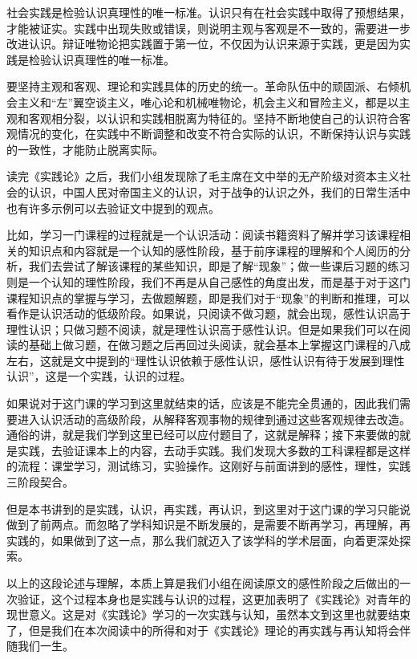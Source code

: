 \documentclass[a4paper, UTF8, twocolumn]{ctexart}
\begin{document}
社会实践是检验认识真理性的唯一标准。认识只有在社会实践中取得了预想结果，才能被证实。实践中出现失败或错误，则说明主观与客观是不一致的，需要进一步改进认识。辩证唯物论把实践置于第一位，不仅因为认识来源于实践，更是因为实践是检验认识真理性的唯一标准。

要坚持主观和客观、理论和实践具体的历史的统一。革命队伍中的顽固派、右倾机会主义和“左”翼空谈主义，唯心论和机械唯物论，机会主义和冒险主义，都是以主观和客观相分裂，以认识和实践相脱离为特征的。坚持不断地使自己的认识符合客观情况的变化，在实践中不断调整和改变不符合实际的认识，不断保持认识与实践的一致性，才能防止脱离实际。

读完《实践论》之后，我们小组发现除了毛主席在文中举的无产阶级对资本主义社会的认识，中国人民对帝国主义的认识，对于战争的认识之外，我们的日常生活中也有许多示例可以去验证文中提到的观点。

比如，学习一门课程的过程就是一个认识活动：阅读书籍资料了解并学习该课程相关的知识点和内容就是一个认知的感性阶段，基于前序课程的理解和个人阅历的分析，我们去尝试了解该课程的某些知识，即是了解“现象”；做一些课后习题的练习则是一个认知的理性阶段，我们不再是从自己感性的角度出发，而是基于对于这门课程知识点的掌握与学习，去做题解题，即是我们对于“现象”的判断和推理，可以看作是认识活动的低级阶段。如果说，只阅读不做习题，就会出现，感性认识高于理性认识；只做习题不阅读，就是理性认识高于感性认识。但是如果我们可以在阅读的基础上做习题，在做习题之后再回过头阅读，就会基本上掌握这门课程的八成左右，这就是文中提到的“理性认识依赖于感性认识，感性认识有待于发展到理性认识”，这是一个实践，认识的过程。

如果说对于这门课的学习到这里就结束的话，应该是不能完全贯通的，因此我们需要进入认识活动的高级阶段，从解释客观事物的规律到通过这些客观规律去改造。通俗的讲，就是我们学到这里已经可以应付题目了，这就是解释；接下来要做的就是实践，去验证课本上的内容，去动手实践。我们发现大多数的工科课程都是这样的流程：课堂学习，测试练习，实验操作。这刚好与前面讲到的感性，理性，实践三阶段契合。

但是本书讲到的是实践，认识，再实践，再认识，到这里对于这门课的学习只能说做到了前两点。而忽略了学科知识是不断发展的，是需要不断再学习，再理解，再实践的，如果做到了这一点，那么我们就迈入了该学科的学术层面，向着更深处探索。

以上的这段论述与理解，本质上算是我们小组在阅读原文的感性阶段之后做出的一次验证，这个过程本身也是实践与认识的过程，这更加表明了《实践论》对青年的现世意义。这是对《实践论》学习的一次实践与认知，虽然本文到这里也就要结束了，但是我们在本次阅读中的所得和对于《实践论》理论的再实践与再认知将会伴随我们一生。
\end{document}
